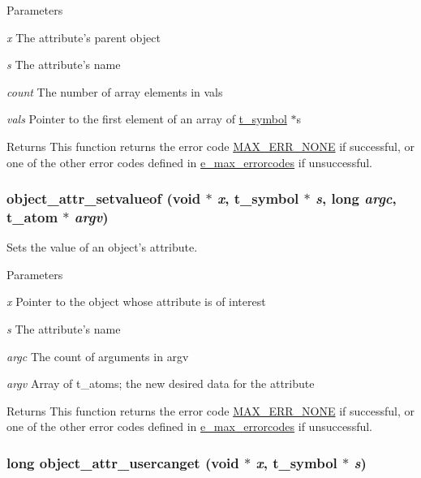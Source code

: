 \begin{DoxyParams}{Parameters}
\item[{\em x}]The attribute's parent object \item[{\em s}]The attribute's name \item[{\em count}]The number of array elements in vals \item[{\em vals}]Pointer to the first element of an array of \hyperlink{structt__symbol}{t\_\-symbol} $\ast$s\end{DoxyParams}
\begin{DoxyReturn}{Returns}
This function returns the error code \hyperlink{group__misc_gga0764dd6c02b76cca7d053ae50555d69da6d22f77fef8b1e1b074cef5d29d935fd}{MAX\_\-ERR\_\-NONE} if successful, or one of the other error codes defined in \hyperlink{group__misc_ga0764dd6c02b76cca7d053ae50555d69d}{e\_\-max\_\-errorcodes} if unsuccessful. 
\end{DoxyReturn}
\hypertarget{group__attr_ga95163d72f6b7500e5986af0f23743e4f}{
\subsubsection[{object\_\-attr\_\-setvalueof}]{ object\_\-attr\_\-setvalueof (void $\ast$ {\em x}, \/  {\bf t\_\-symbol} $\ast$ {\em s}, \/  long {\em argc}, \/  {\bf t\_\-atom} $\ast$ {\em argv})}}
\label{group__attr_ga95163d72f6b7500e5986af0f23743e4f}


Sets the value of an object's attribute. 
\begin{DoxyParams}{Parameters}
\item[{\em x}]Pointer to the object whose attribute is of interest \item[{\em s}]The attribute's name \item[{\em argc}]The count of arguments in {\ttfamily argv} \item[{\em argv}]Array of t\_\-atoms; the new desired data for the attribute\end{DoxyParams}
\begin{DoxyReturn}{Returns}
This function returns the error code \hyperlink{group__misc_gga0764dd6c02b76cca7d053ae50555d69da6d22f77fef8b1e1b074cef5d29d935fd}{MAX\_\-ERR\_\-NONE} if successful, or one of the other error codes defined in \hyperlink{group__misc_ga0764dd6c02b76cca7d053ae50555d69d}{e\_\-max\_\-errorcodes} if unsuccessful. 
\end{DoxyReturn}
\hypertarget{group__attr_ga92423948e8671cf9796a247f9caef706}{
\subsubsection[{object\_\-attr\_\-usercanget}]{\setlength{\rightskip}{0pt plus 5cm}long object\_\-attr\_\-usercanget (void $\ast$ {\em x}, \/  {\bf t\_\-symbol} $\ast$ {\em s})}}
\label{group__attr_ga92423948e8671cf9796a247f9caef706}


